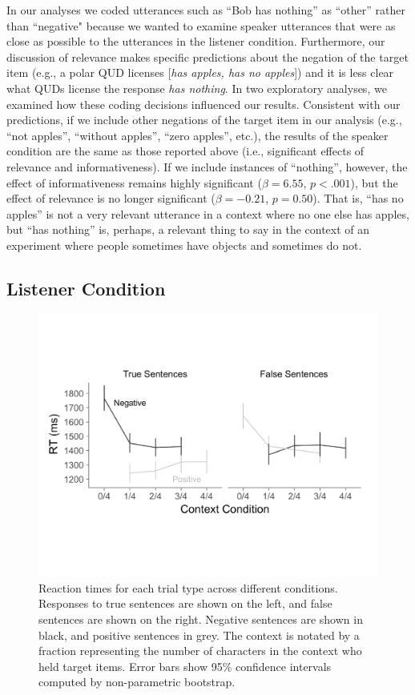 \documentclass[man, floatsintext, noapacite]{apa6}
\begin{document}
In our analyses we coded utterances such as ``Bob has nothing'' as ``other'' rather than ``negative" because we wanted to examine speaker utterances that were as close as possible to the utterances in the listener condition. Furthermore, our discussion of relevance makes specific predictions about the negation of the target item (e.g., a polar QUD licenses [\textit{has apples, has no apples}]) and it is less clear what QUDs license the response \textit{has nothing}. In two exploratory analyses, we examined how these coding decisions influenced our results. Consistent with our predictions, if we include other negations of the target item in our analysis (e.g., ``not apples'', ``without apples'', ``zero apples'', etc.), the results of the speaker condition are the same as those reported above (i.e., significant effects of relevance and informativeness). If we include instances of ``nothing'', however, the effect of informativeness remains highly significant ($\beta= 6.55$, $p< .001$), but the effect of relevance is no longer significant ($\beta= -0.21$, $p = 0.50$). That is, ``has no apples'' is not a very relevant utterance in a context where no one else has apples, but ``has nothing'' is, perhaps, a relevant thing to say in the context of an experiment where people sometimes have objects and sometimes do not. 

\subsection{Listener Condition}

\begin{figure}[t]
\begin{center} 
\includegraphics[width=6in]{figures/rts_mod2.pdf}
\caption{\label{fig:listenerrt} Reaction times for each trial type across different conditions. Responses to true sentences are shown on the left, and false sentences are shown on the right.  Negative sentences are shown in black, and positive sentences in grey.  The context is notated by a fraction representing the number of characters in the context who held target items. Error bars show 95\% confidence intervals computed by non-parametric bootstrap.}
\end{center} 
\end{figure}
\end{document}

